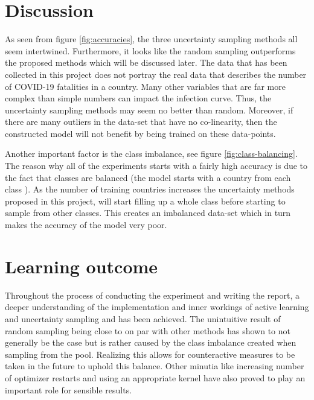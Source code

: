 \documentclass[12pt,fleqn]{article}
\begin{document}
		
	\begin{multicols}{2}

		\section{Discussion} %
			
		As seen from figure \ref{fig:accuracies}, the three uncertainty sampling methods all seem intertwined. Furthermore, it looks like the random sampling outperforms the proposed methods which will be discussed later. The data that has been collected  in this project does not portray the real data that describes the number of COVID-19 fatalities in a country. Many other variables that are far more complex than simple numbers can impact the infection curve. Thus, the uncertainty sampling methods may seem no better than random. Moreover, if there are many outliers in the data-set that have no co-linearity, then the constructed model will not benefit by being trained on these data-points. \noindent
		
		Another important factor is the class imbalance, see figure \ref{fig:class-balancing}. The reason why all of the experiments starts with a fairly high accuracy is due to the fact that classes are balanced (the model starts with a country from each class ). As the number of training countries increases the uncertainty methods proposed in this project, will start filling up a whole class before starting to sample from other classes. This creates an imbalanced data-set which in turn makes the accuracy of the model very poor. 
			
			
		\section{Learning outcome} %
		Throughout the process of conducting the experiment and writing the report, a deeper understanding of the implementation and inner workings of active learning and uncertainty sampling and has been achieved. The unintuitive result of random sampling being close to on par with other methods has shown to not generally be the case but is rather caused by the class imbalance created when sampling from the pool. Realizing this allows for counteractive measures to be taken in the future to uphold this balance. Other minutia like increasing number of optimizer restarts and using an appropriate kernel have also proved to play an important role for sensible results.
			
	\end{multicols}
\end{document}
